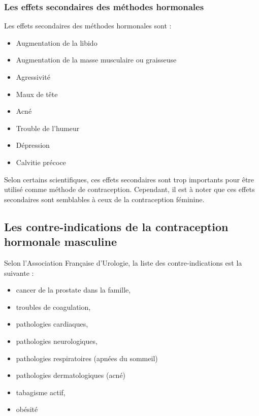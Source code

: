 \documentclass[12pt,a4paper]{report}
\begin{document}
\subsubsection{Les effets secondaires des méthodes hormonales} \label{effets-secondaires-methodes-hormonales}

Les effets secondaires des méthodes hormonales sont :
\begin{itemize}
    \item Augmentation de la libido
    \item Augmentation de la masse musculaire ou graisseuse
    \item Agressivité
    \item Maux de tête
    \item Acné
    \item Trouble de l'humeur
    \item Dépression
    \item Calvitie précoce \cites{guillaumedaudinContraceptesEnqueteDernier2022}{anne-sophiedelcourHommeSousPilule}{ContraceptionHormonaleMasculine2016}
\end{itemize}

Selon certains scientifiques, ces effets secondaires sont trop importants pour être utilisé comme méthode de contraception. Cependant, il est à noter que ces effets secondaires sont semblables à ceux de la contraception féminine. \cite{ContraceptionHormonaleMasculine2016}

\subsection{Les contre-indications de la contraception hormonale masculine}

Selon l'Association Française d'Urologie, la liste des contre-indications est la suivante :

\begin{itemize}
    \item cancer de la prostate dans la famille,
    \item troubles de coagulation,
    \item pathologies cardiaques,
    \item pathologies neurologiques,
    \item pathologies respiratoires (apnées du sommeil)
    \item pathologies dermatologiques (acné)
    \item tabagisme actif,
    \item obésité   \cite{tcherdukianContraceptionMasculineQuelles2020}
\end{itemize}
\end{document}
